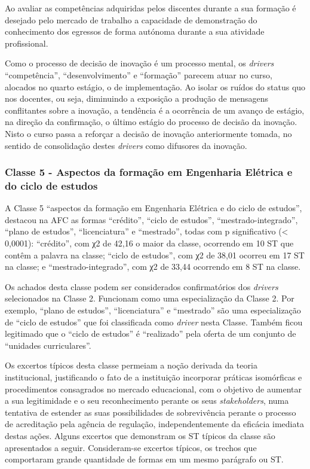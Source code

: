 \documentclass{textolivre}
\begin{document}
Ao avaliar as competências adquiridas pelos discentes durante a sua formação é desejado pelo mercado de trabalho a capacidade de demonstração do conhecimento dos egressos de forma autónoma durante a sua atividade profissional.

Como o processo de decisão de inovação é um processo mental, os \textit{drivers} “competência”, “desenvolvimento” e “formação” parecem atuar no curso, alocados no quarto estágio, o de implementação. Ao isolar os ruídos do status quo nos docentes, ou seja, diminuindo a exposição a produção de mensagens conflitantes sobre a inovação, a tendência é a ocorrência de um avanço de estágio, na direção da confirmação, o último estágio do processo de decisão da inovação. Nisto o curso passa a reforçar a decisão de inovação anteriormente tomada, no sentido de consolidação destes \textit{drivers} como difusores da inovação.

\subsubsection{Classe 5 - Aspectos da formação em Engenharia Elétrica e do ciclo de estudos}\label{sec-aspectos}
A Classe 5 “aspectos da formação em Engenharia Elétrica e do ciclo de estudos”, destacou na AFC as formas “crédito”, “ciclo de estudos”, “mestrado-integrado”, “plano de estudos”, “licenciatura” e “mestrado”, todas com p significativo (< 0,0001): “crédito”, com χ2 de 42,16 o maior da classe, ocorrendo em 10 ST que contêm a palavra na classe; “ciclo de estudos”, com χ2 de 38,01 ocorreu em 17 ST na classe; e “mestrado-integrado”, com χ2 de 33,44 ocorrendo em 8 ST na classe.

Os achados desta classe podem ser considerados confirmatórios dos \textit{drivers} selecionados na Classe 2. Funcionam como uma especialização da Classe 2. Por exemplo, “plano de estudos”, “licenciatura” e “mestrado” são uma especialização de “ciclo de estudos” que foi classificada como \textit{driver} nesta Classe. Também ficou legitimado que o “ciclo de estudos” é “realizado” pela oferta de um conjunto de “unidades curriculares”.

Os excertos típicos desta classe permeiam a noção derivada da teoria institucional, justificando o fato de a instituição incorporar práticas isomórficas e procedimentos consagrados no mercado educacional, com o objetivo de aumentar a sua legitimidade e o seu reconhecimento perante os seus \textit{stakeholders}, numa tentativa de estender as suas possibilidades de sobrevivência perante o processo de acreditação pela agência de regulação, independentemente da eficácia imediata destas ações. Alguns excertos que demonstram os ST típicos da classe são apresentados a seguir. Consideram-se excertos típicos, os trechos que comportaram grande quantidade de formas em um mesmo parágrafo ou ST.
\end{document}
